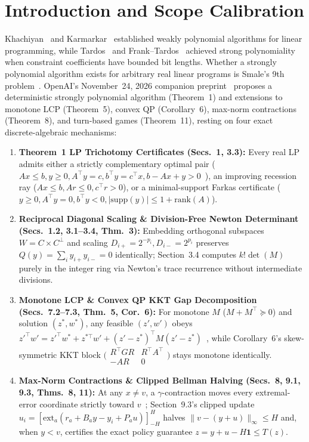 \documentclass[10pt,twocolumn]{article}
\begin{document}
\section{Introduction and Scope Calibration}\label{sec:intro}
Khachiyan~\cite{khachiyan1979polynomial} and Karmarkar~\cite{karmarkar1984new} established weakly polynomial algorithms for linear programming, while Tardos~\cite{tardos1986strongly} and Frank--Tardos~\cite{frank1987application} achieved strong polynomiality when constraint coefficients have bounded bit lengths. Whether a strongly polynomial algorithm exists for arbitrary real linear programs is Smale's 9th problem~\cite{smale1998mathematical}. OpenAI's November~24, 2026 companion preprint~\cite{openai2026splp} proposes a deterministic strongly polynomial algorithm (Theorem~1) and extensions to monotone LCP (Theorem~5), convex QP (Corollary~6), max-norm contractions (Theorem~8), and turn-based games (Theorem~11), resting on four exact discrete-algebraic mechanisms:
\begin{enumerate}[leftmargin=1.2em,itemsep=1pt,topsep=2pt]
  \item \textbf{Theorem~1 LP Trichotomy Certificates (Secs.~1, 3.3):} Every real LP admits either a strictly complementary optimal pair ($Ax\le b, y\ge 0, A^\top y=c, b^\top y=c^\top x, b-Ax+y>0$~\cite{goldman1956theory}), an improving recession ray ($Ax\le b, Ar\le 0, c^\top r>0$), or a minimal-support Farkas certificate ($y\ge 0, A^\top y=0, b^\top y<0, |\mathrm{supp}(y)|\le 1+\mathrm{rank}(A)$).
  \item \textbf{Reciprocal Diagonal Scaling \& Division-Free Newton Determinant (Secs.~1.2, 3.1--3.4, Thm.~3):} Embedding orthogonal subspaces $W=C\times C^\perp$ and scaling $D_{i+}=2^{-p_i}, D_{i-}=2^{p_i}$ preserves $Q(y)=\sum_i y_{i+}y_{i-}=0$ identically; Section~3.4 computes $k!\det(M)$ purely in the integer ring via Newton's trace recurrence without intermediate divisions.
  \item \textbf{Monotone LCP \& Convex QP KKT Gap Decomposition (Secs.~7.2--7.3, Thm.~5, Cor.~6):} For monotone $M$ ($M+M^\top\succeq 0$) and solution $(z^*,w^*)$, any feasible $(z',w')$ obeys $z'^\top w'=z'^\top w^*+z^{*\top}w'+(z'-z^*)^\top M(z'-z^*)$~\cite{mangasarian1988simple}, while Corollary~6's skew-symmetric KKT block $\bigl(\begin{smallmatrix}R^\top GR&R^\top A^\top\\-AR&0\end{smallmatrix}\bigr)$ stays monotone identically.
  \item \textbf{Max-Norm Contractions \& Clipped Bellman Halving (Secs.~8, 9.1, 9.3, Thms.~8, 11):} At any $x\ne v$, a $\gamma$-contraction moves every extremal-error coordinate strictly toward $v$~\cite{shapley1953stochastic}; Section~9.3's clipped update $u_i=[\mathrm{ext}_a(r_a+B_ay-y_i+P_au)]_{-H}^H$ halves $\|v-(y+u)\|_\infty\le H$ and, when $y<v$, certifies the exact policy guarantee $z=y+u-H\mathbf{1}\le T(z)$.
\end{enumerate}
\end{document}
